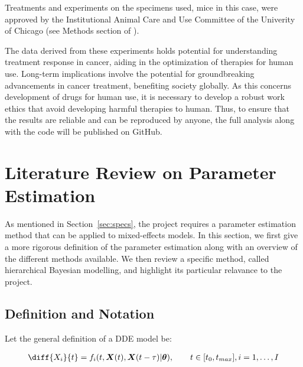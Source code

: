 \documentclass[11pt]{article}
\begin{document}
Treatments and experiments on the specimens used, mice in this case, were approved by the Institutional Animal Care and Use Committee of the Univerity of Chicago (see Methods section of \cite{cbdil12}).

The data derived from these experiments holds potential for understanding treatment response in cancer, aiding in the optimization of therapies for human use. Long-term implications involve the potential for groundbreaking advancements in cancer treatment, benefiting society globally. As this concerns development of drugs for human use, it is necessary to develop a robust work ethics that avoid developing harmful therapies to human. Thus, to ensure that the results are reliable and can be reproduced by anyone, the full analysis along with the code will be published on GitHub.

\section{Literature Review on Parameter Estimation}\label{sec:littrev}

As mentioned in Section~\ref{sec:specs}, the project requires a parameter estimation method that can be applied to mixed-effects models. In this section, we first give a more rigorous definition of the parameter estimation along with an overview of the different methods available. We then review a specific method, called hierarchical Bayesian modelling, and highlight its particular relavance to the project. 

\subsection{Definition and Notation}
Let the general definition of a DDE model be: 

\begin{align*}
    \diff{X_i}{t} = f_i(t, \boldsymbol{X}(t), \boldsymbol{X}(t-\tau)| \boldsymbol{\theta}), \qquad t \in [t_0, t_{max}], i = 1, \ldots, I
\end{align*}
\end{document}

